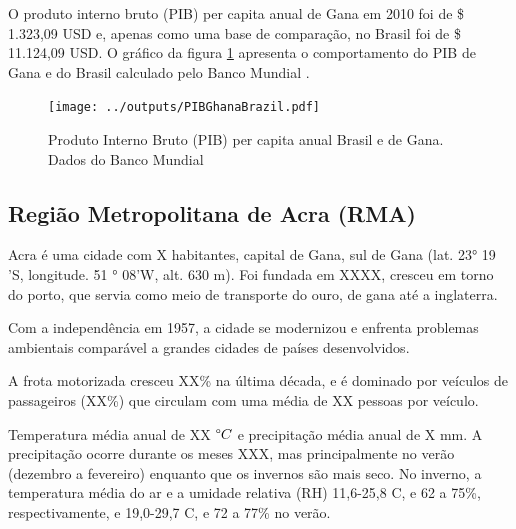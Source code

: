  
O produto interno bruto (PIB) per capita anual de Gana em 2010 foi
de \$ 1.323,09 USD e, apenas como uma base de comparação, no Brasil 
foi de \$ 11.124,09 USD. O gráfico da figura \ref{fg:pib} apresenta o 
comportamento do PIB de Gana e do Brasil calculado pelo Banco Mundial 
\citep{bancomundial}.




\begin{figure}[H]
\begin{center}
  \texttt{[image: ../outputs/PIBGhanaBrazil.pdf]}
  \caption{Produto Interno Bruto (PIB) per capita anual Brasil e de Gana. 
           Dados do Banco Mundial \citep{bancomundial} \label{fg:pib}}
\end{center}
\end{figure}


\subsection{Região Metropolitana de Acra (RMA)}


Acra é uma cidade com X habitantes, capital de Gana, 
sul de Gana (lat. 23° 19 'S, longitude. 51 ° 08'W, alt. 630 m). 
Foi fundada em XXXX, cresceu em torno do porto, que servia como meio de transporte
do ouro, de gana até a inglaterra. 

Com a independência em 1957, a cidade se modernizou e enfrenta problemas 
ambientais comparável a grandes cidades de países desenvolvidos. 

A frota motorizada cresceu XX\% na última década, e é dominado por veículos 
de passageiros (XX\%) que circulam com uma média de XX pessoas por veículo. 

Temperatura média anual de XX $\degree C$ e precipitação média anual de X mm. 
A precipitação ocorre durante os meses XXX, mas principalmente no verão 
(dezembro a fevereiro) enquanto que os invernos são mais seco. 
No inverno, a temperatura média do ar e a umidade relativa (RH) 11,6-25,8 C, 
e 62 a 75\%, respectivamente, e 19,0-29,7 C, e 72 a 77\% no verão. 



